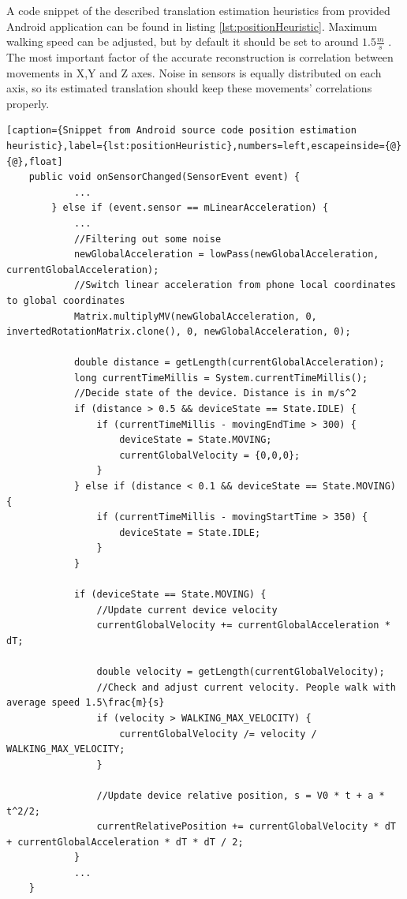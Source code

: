 A code snippet of the described translation estimation heuristics from provided Android application can be found in listing \ref{lst:positionHeuristic}. Maximum walking speed can be adjusted, but by default it should be set to around $1.5\frac{m}{s}$ \cite{website:walkingSpeed}. 
The most important factor of the accurate reconstruction is correlation between movements in X,Y and Z axes. Noise in sensors is equally distributed on each axis, so its estimated translation should keep these movements' correlations properly.

\begin{lstlisting}[caption={Snippet from Android source code position estimation heuristic},label={lst:positionHeuristic},numbers=left,escapeinside={@}{@},float]
    public void onSensorChanged(SensorEvent event) {
            ...
        } else if (event.sensor == mLinearAcceleration) { 
            ...   
            //Filtering out some noise
            newGlobalAcceleration = lowPass(newGlobalAcceleration, currentGlobalAcceleration);
            //Switch linear acceleration from phone local coordinates to global coordinates
            Matrix.multiplyMV(newGlobalAcceleration, 0, invertedRotationMatrix.clone(), 0, newGlobalAcceleration, 0);

            double distance = getLength(currentGlobalAcceleration);
            long currentTimeMillis = System.currentTimeMillis();
            //Decide state of the device. Distance is in m/s^2
            if (distance > 0.5 && deviceState == State.IDLE) {
                if (currentTimeMillis - movingEndTime > 300) {
                    deviceState = State.MOVING;
                    currentGlobalVelocity = {0,0,0};
                }
            } else if (distance < 0.1 && deviceState == State.MOVING) {
                if (currentTimeMillis - movingStartTime > 350) {
                    deviceState = State.IDLE;
                }
            }

            if (deviceState == State.MOVING) {
                //Update current device velocity
                currentGlobalVelocity += currentGlobalAcceleration * dT;
                
                double velocity = getLength(currentGlobalVelocity);
                //Check and adjust current velocity. People walk with average speed 1.5\frac{m}{s}
                if (velocity > WALKING_MAX_VELOCITY) {
                    currentGlobalVelocity /= velocity / WALKING_MAX_VELOCITY;
                }
                
                //Update device relative position, s = V0 * t + a * t^2/2;
                currentRelativePosition += currentGlobalVelocity * dT + currentGlobalAcceleration * dT * dT / 2;                 
            }
            ...
    }   
\end{lstlisting}

